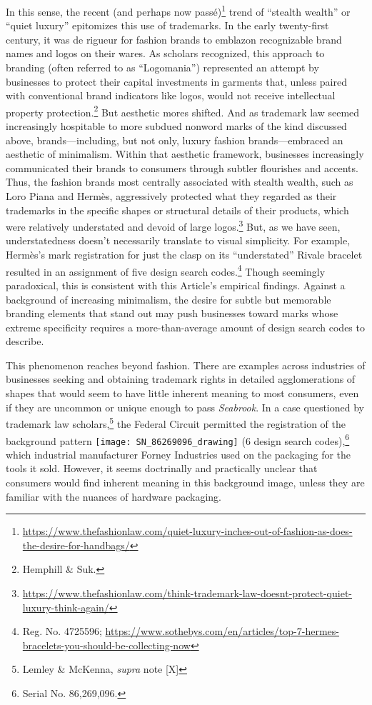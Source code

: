 \documentclass[letterpaper, 11pt, oneside]{article}
\begin{document}
In this sense, the recent (and perhaps now passé)\footnote{\url{https://www.thefashionlaw.com/quiet-luxury-inches-out-of-fashion-as-does-the-desire-for-handbags/}} trend of ``stealth wealth'' or ``quiet luxury'' epitomizes this use of trademarks. In the early twenty-first century, it was de rigueur for fashion brands to emblazon recognizable brand names and logos on their wares. As scholars recognized, this approach to branding (often referred to as ``Logomania'') represented an attempt by businesses to protect their capital investments in garments that, unless paired with conventional brand indicators like logos, would not receive intellectual property protection.\footnote{Hemphill \& Suk.} But aesthetic mores shifted. And as trademark law seemed increasingly hospitable to more subdued nonword marks of the kind discussed above, brands—including, but not only, luxury fashion brands—embraced an aesthetic of minimalism. Within that aesthetic framework, businesses increasingly communicated their brands to consumers through subtler flourishes and accents. Thus, the fashion brands most centrally associated with stealth wealth, such as Loro Piana and Hermès, aggressively protected what they regarded as their trademarks in the specific shapes or structural details of their products, which were relatively understated and devoid of large logos.\footnote{\url{https://www.thefashionlaw.com/think-trademark-law-doesnt-protect-quiet-luxury-think-again/}} But, as we have seen, understatedness doesn't necessarily translate to visual simplicity. For example, Hermès's mark registration for just the clasp on its ``understated'' Rivale bracelet resulted in an assignment of five design search codes.\footnote{Reg. No. 4725596; \url{https://www.sothebys.com/en/articles/top-7-hermes-bracelets-you-should-be-collecting-now}} Though seemingly paradoxical, this is consistent with this Article's empirical findings. Against a background of increasing minimalism, the desire for subtle but memorable branding elements that stand out may push businesses toward marks whose extreme specificity requires a more-than-average amount of design search codes to describe.

This phenomenon reaches beyond fashion. There are examples across industries of businesses seeking and obtaining trademark rights in detailed agglomerations of shapes that would seem to have little inherent meaning to most consumers, even if they are uncommon or unique enough to pass \textit{Seabrook}. In a case questioned by trademark law scholars,\footnote{Lemley \& McKenna, \textit{supra} note [X]} the Federal Circuit permitted the registration of the background pattern \texttt{[image: SN\_86269096\_drawing]} (6 design search codes),\footnote{Serial No. 86,269,096.} which industrial manufacturer Forney Industries used on the packaging for the tools it sold. However, it seems doctrinally and practically unclear that consumers would find inherent meaning in this background image, unless they are familiar with the nuances of hardware packaging.
\end{document}
